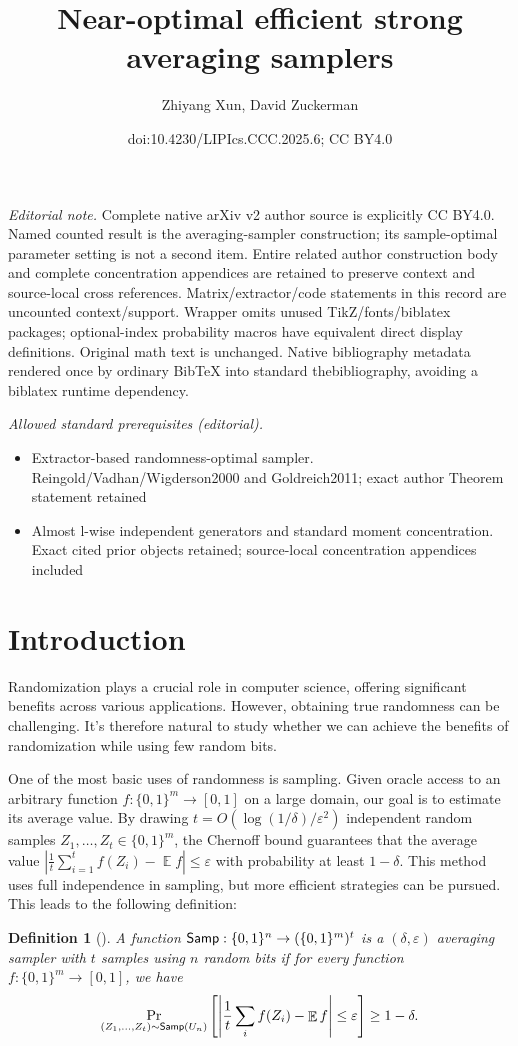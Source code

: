 \documentclass[10pt,a4paper]{article}
\title{Near-optimal efficient strong averaging samplers}
\author{Zhiyang Xun, David Zuckerman}
\date{doi:10.4230/LIPIcs.CCC.2025.6; CC BY4.0}
\newtheorem{definition}[theorem]{Definition}
\DeclareMathOperator*{\E}{\mathbb{E}}
\newcommand{\eps}{\varepsilon}
\newcommand{\1}{\mathbbm{1}}
\newcommand{\abs}[1]{\left|#1\right| }
\newcommand{\zo}{\{0, 1\}}
\newcommand{\Smp}{\textup{\textsf{Samp}}}
\begin{document}
\maketitle
\noindent\textit{Editorial note.} Complete native arXiv v2 author source is explicitly CC BY4.0. Named counted result is the averaging-sampler construction; its sample-optimal parameter setting is not a second item. Entire related author construction body and complete concentration appendices are retained to preserve context and source-local cross references. Matrix/extractor/code statements in this record are uncounted context/support. Wrapper omits unused TikZ/fonts/biblatex packages; optional-index probability macros have equivalent direct display definitions. Original math text is unchanged. Native bibliography metadata rendered once by ordinary BibTeX into standard thebibliography, avoiding a biblatex runtime dependency.\par\medskip
\noindent\textit{Allowed standard prerequisites (editorial).}\begin{itemize}
\item Extractor-based randomness-optimal sampler. Reingold/Vadhan/Wigderson2000 and Goldreich2011; exact author Theorem statement retained
\item Almost l-wise independent generators and standard moment concentration. Exact cited prior objects retained; source-local concentration appendices included
\end{itemize}\medskip
\section{Introduction}
Randomization plays a crucial role in computer science, offering significant benefits across various applications. However, obtaining true randomness can be challenging.
It's therefore natural to study whether we can achieve the benefits of randomization while using few random bits.

One of the most basic uses of randomness is sampling. 
Given oracle access to an arbitrary function $f: \zo^m \to [0, 1]$ on a large domain, our goal is to estimate its average value.
By drawing $t = O(\log(1/\delta)/\eps^2)$ independent random samples $Z_1, \dots, Z_t \in \zo^m$, 
the Chernoff bound guarantees that the average value $\abs{\frac{1}{t} \sum_{i=1}^t f(Z_i) - \E f} \le \eps$ with probability at least $1 - \delta$. This method uses full independence in sampling, but more efficient strategies can be pursued. This leads to the following definition:
\begin{definition}[\cite{bellare1994randomness}]
    A function $\Smp : \zo^n \to (\zo^m)^t$ is a $(\delta, \eps)$ averaging sampler with $t$ samples using $n$ random bits if for every function $f : \zo^m \to [0, 1]$, we have \[
    \Pr_{(Z_1, \dots, Z_t) \sim \Smp(U_n)}
    \left[ \abs{\frac{1}{t}  \sum_i f(Z_i) - \E f} \leq \varepsilon \right]
    \geq 1 - \delta.
    \]
\end{definition}
\end{document}
